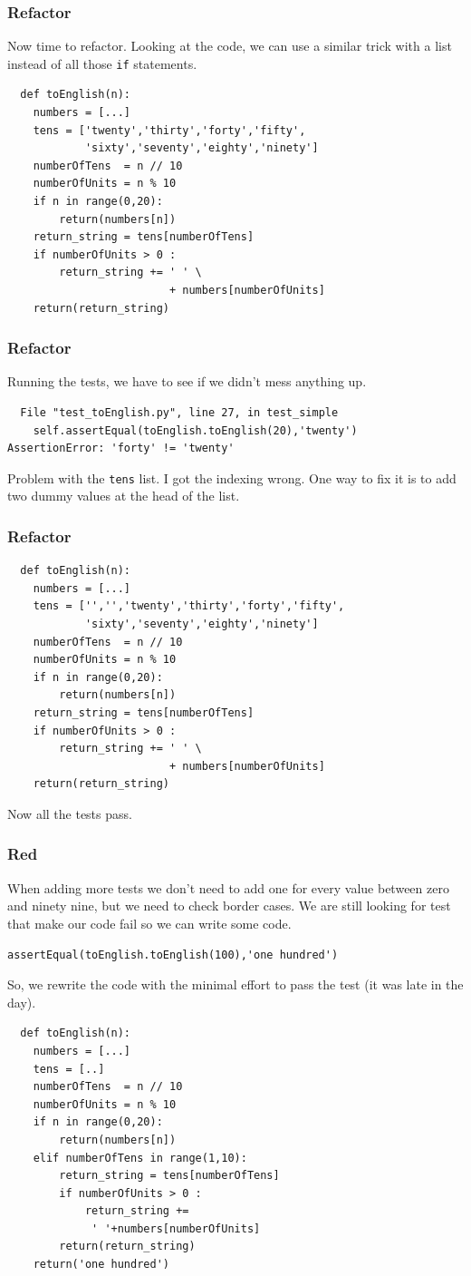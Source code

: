 \documentclass{beamer}
\begin{document}
\begin{frame}[fragile]
\frametitle{Refactor}
Now time to refactor. Looking at the code, we can use a similar trick
with a list instead of all those {\tt if} statements.
\begin{lstlisting}
  def toEnglish(n):
    numbers = [...]
    tens = ['twenty','thirty','forty','fifty',
            'sixty','seventy','eighty','ninety']
    numberOfTens  = n // 10
    numberOfUnits = n % 10
    if n in range(0,20):
        return(numbers[n])
    return_string = tens[numberOfTens]
    if numberOfUnits > 0 :
        return_string += ' ' \
                         + numbers[numberOfUnits]
    return(return_string)
\end{lstlisting}
\end{frame}
\begin{frame}[fragile]
  \frametitle{Refactor}
Running the tests, we have to see if we didn't mess anything up.
\begin{verbatim}
  File "test_toEnglish.py", line 27, in test_simple
    self.assertEqual(toEnglish.toEnglish(20),'twenty')
AssertionError: 'forty' != 'twenty'
\end{verbatim}
Problem with the {\tt tens} list. I got the indexing wrong. One way to
fix it is to add two dummy values at the head of the list.
\end{frame}
\begin{frame}[fragile]
\frametitle{Refactor}
\begin{lstlisting}
  def toEnglish(n):
    numbers = [...]
    tens = ['','','twenty','thirty','forty','fifty',
            'sixty','seventy','eighty','ninety']
    numberOfTens  = n // 10
    numberOfUnits = n % 10
    if n in range(0,20):
        return(numbers[n])
    return_string = tens[numberOfTens]
    if numberOfUnits > 0 :
        return_string += ' ' \
                         + numbers[numberOfUnits]
    return(return_string)
\end{lstlisting}  
Now all the tests pass.
\end{frame}
\begin{frame}[fragile]
\frametitle{Red}
When adding more tests we don't need to add one for every value between
zero and ninety nine, but we need to check border cases. We are still
looking for test that make our code fail so we can write some code.
\begin{lstlisting}
assertEqual(toEnglish.toEnglish(100),'one hundred')
\end{lstlisting}
\end{frame}
\begin{frame}[fragile]
So, we rewrite the code with the minimal effort to pass the test (it
was late in the day).
\begin{lstlisting}
  def toEnglish(n):
    numbers = [...]
    tens = [..] 
    numberOfTens  = n // 10
    numberOfUnits = n % 10
    if n in range(0,20):
        return(numbers[n])
    elif numberOfTens in range(1,10):
        return_string = tens[numberOfTens]
        if numberOfUnits > 0 :
            return_string += 
             ' '+numbers[numberOfUnits]
        return(return_string)
    return('one hundred')
\end{lstlisting}
\end{frame}
\end{document}

